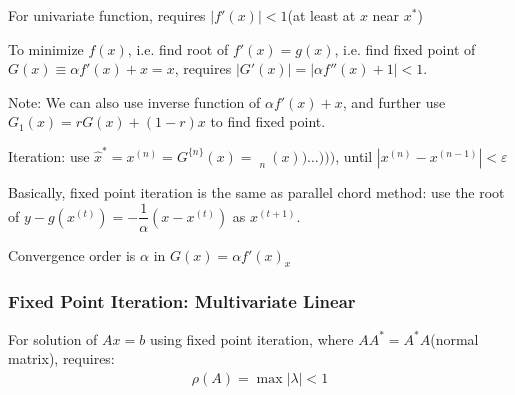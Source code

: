     For univariate function, requires $ |f'(x)|<1 $(at least at $ x $ near $ x^* $)

    To minimize $ f(x) $, i.e. find root of $ f'(x)=g(x) $, i.e. find fixed point of $ G(x)\equiv \alpha f'(x)+x=x $, requires $ |G'(x)|=|\alpha f''(x)+1|<1 $.

    Note: We can also use inverse function of $ \alpha f'(x)+x $, and further use $ G_1(x)=rG(x)+(1-r)x $ to find fixed point.

    Iteration: use $ \hat{x}^*=x^{(n)}= G^{\{n\}}(x)=\mathop{\underbrace{G(G(G(\ldots G(G}}\limits_{n}(x))\ldots ))) $, until $ |x^{(n)}-x^{(n-1)}|<\varepsilon  $

    Basically, fixed point iteration is the same as parallel chord method: use the root of $ y-g(x^{(t)})=-\dfrac{1}{\alpha } (x-x^{(t)}) $ as $ x^{(t+1)} $.

    Convergence order is $ \alpha  $ in $ G(x)=\alpha f'(x)_x $


\subsubsection{Fixed Point Iteration: Multivariate Linear}
    For solution of $ Ax=b $ using fixed point iteration, where $ AA^*=A^*A $(normal matrix), requires:
    \begin{align}
        \rho (A)=\max|\lambda |<1 
    \end{align}
    
